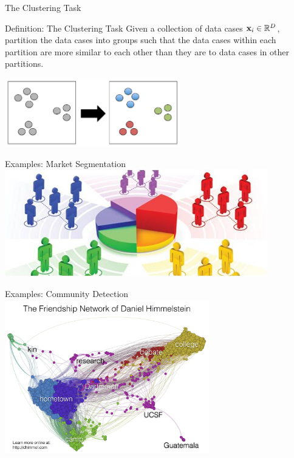 \documentclass[serif,xcolor=pdftex,dvipsnames,table,hyperref={bookmarks=false,breaklinks}]{beamer}
\begin{document}
\begin{frame}[t]{The Clustering Task}

\begin{block}{Definition: The Clustering Task}
Given a collection of data cases ${\mathbf{x}}_i\in\mathbb{R}^D$, partition the 
data cases into groups such that the data cases within each partition are
more similar to each other than they are to data cases in other partitions.
\end{block}

\pause
\center
\includegraphics[width=3in]{../Figures/clustering_example.png}
\end{frame}

\begin{frame}[t]{Examples: Market Segmentation}
\center
\includegraphics[width=4.5in]{../Figures/market_segmentation.jpg}
\end{frame}

\begin{frame}[t]{Examples: Community Detection}
\center
\includegraphics[width=3.5in]{../Figures/community_detection.jpg}
\end{frame}
\end{document}
